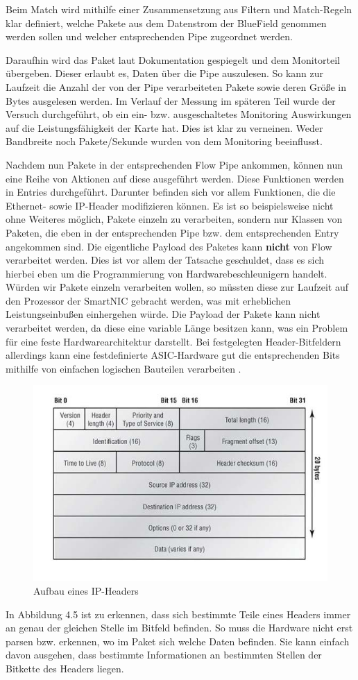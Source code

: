 Beim Match wird mithilfe einer Zusammensetzung aus Filtern und Match-Regeln klar definiert, welche Pakete aus dem Datenstrom der BlueField genommen werden sollen und welcher entsprechenden Pipe zugeordnet werden. 

Daraufhin wird das Paket laut Dokumentation gespiegelt und dem Monitorteil übergeben. Dieser erlaubt es, Daten über die Pipe auszulesen. So kann zur Laufzeit die Anzahl der von der Pipe verarbeiteten Pakete sowie deren Größe in Bytes ausgelesen werden. Im Verlauf der Messung im späteren Teil wurde der Versuch durchgeführt, ob ein ein- bzw. ausgeschaltetes Monitoring Auswirkungen auf die Leistungsfähigkeit der Karte hat. Dies ist klar zu verneinen. Weder Bandbreite noch Pakete/Sekunde wurden von dem Monitoring beeinflusst.

Nachdem nun Pakete in der entsprechenden Flow Pipe ankommen, können nun eine Reihe von Aktionen auf diese ausgeführt werden. Diese Funktionen werden in Entries durchgeführt. Darunter befinden sich vor allem Funktionen, die die Ethernet- sowie IP-Header modifizieren können. Es ist so beispielsweise nicht ohne Weiteres möglich, Pakete einzeln zu verarbeiten, sondern nur Klassen von Paketen, die eben in der entsprechenden Pipe bzw. dem entsprechenden Entry angekommen sind. Die eigentliche Payload des Paketes kann \textbf{nicht} von Flow verarbeitet werden. Dies ist vor allem der Tatsache geschuldet, dass es sich hierbei eben um die Programmierung von Hardwarebeschleunigern handelt. Würden wir Pakete einzeln verarbeiten wollen, so müssten diese zur Laufzeit auf den Prozessor der SmartNIC gebracht werden, was mit erheblichen Leistungseinbußen einhergehen würde.
Die Payload der Pakete kann nicht verarbeitet werden, da diese eine variable Länge besitzen kann, was ein Problem für eine feste Hardwarearchitektur darstellt. Bei festgelegten Header-Bitfeldern allerdings kann eine festdefinierte ASIC-Hardware gut die entsprechenden Bits mithilfe von einfachen logischen Bauteilen verarbeiten \cite{nvidia_doca_flow_v1_2}.
\begin{figure}
    \centering
    \includegraphics[width=0.8\linewidth]{images/Ip_pic.jpg}
    \caption{Aufbau eines IP-Headers \cite{wikimedia_ip_pic}}
    \label{fig:enter-label}
\end{figure}
In Abbildung 4.5 ist zu erkennen, dass sich bestimmte Teile eines Headers immer an genau der gleichen Stelle im Bitfeld befinden. So muss die Hardware nicht erst parsen bzw. erkennen, wo im Paket sich welche Daten befinden. Sie kann einfach davon ausgehen, dass bestimmte Informationen an bestimmten Stellen der Bitkette des Headers liegen.


